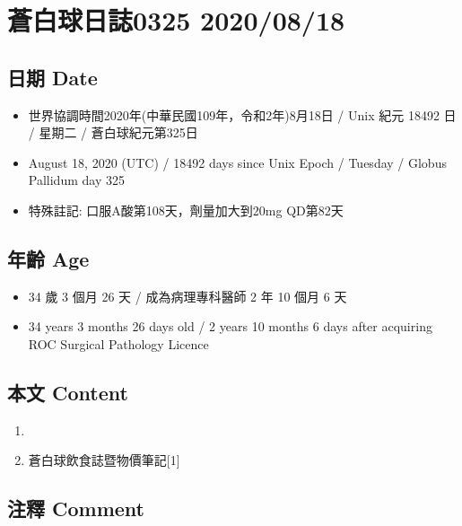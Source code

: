 \documentclass[a5paper, 11pt
]{book}
\providecommand{\tightlist}{%
  \setlength{\itemsep}{0pt}\setlength{\parskip}{0pt}}
\begin{document}
\hypertarget{ux84bcux767dux7403ux65e5ux8a8c0325-20200818}{%
\section{蒼白球日誌0325
2020/08/18}\label{ux84bcux767dux7403ux65e5ux8a8c0325-20200818}}

\hypertarget{ux65e5ux671f-date-78}{%
\subsection{日期 Date}\label{ux65e5ux671f-date-78}}

\begin{itemize}
\tightlist
\item
  世界協調時間2020年(中華民國109年，令和2年)8月18日 / Unix 紀元 18492 日
  / 星期二 / 蒼白球紀元第325日
\item
  August 18, 2020 (UTC) / 18492 days since Unix Epoch / Tuesday / Globus
  Pallidum day 325
\item
  特殊註記: 口服A酸第108天，劑量加大到20mg QD第82天
\end{itemize}

\hypertarget{ux5e74ux9f61-age-78}{%
\subsection{年齡 Age}\label{ux5e74ux9f61-age-78}}

\begin{itemize}
\tightlist
\item
  34 歲 3 個月 26 天 / 成為病理專科醫師 2 年 10 個月 6 天
\item
  34 years 3 months 26 days old / 2 years 10 months 6 days after
  acquiring ROC Surgical Pathology Licence
\end{itemize}

\hypertarget{ux672cux6587-content-78}{%
\subsection{本文 Content}\label{ux672cux6587-content-78}}

\begin{enumerate}
\def\labelenumi{\arabic{enumi}.}
\tightlist
\item
\item
  蒼白球飲食誌暨物價筆記{[}1{]}
\end{enumerate}

\hypertarget{ux6ce8ux91cb-comment-78}{%
\subsection{注釋 Comment}\label{ux6ce8ux91cb-comment-78}}
\end{document}
